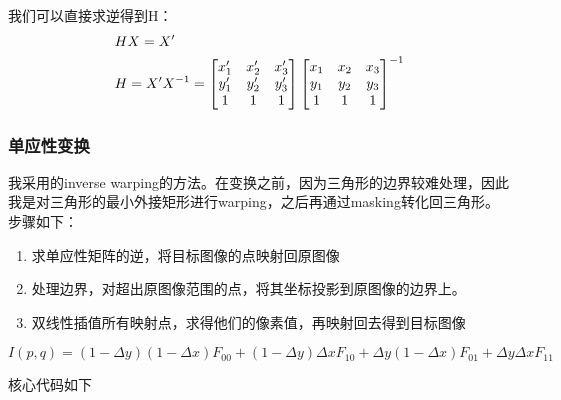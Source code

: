 \documentclass[a4paper]{article}
\begin{document}
我们可以直接求逆得到H：
 \begin{align}
 \centering
 &HX  = X'\\
&H= X'X^{-1} = \begin{bmatrix}x'_1 & x'_2 & x'_3 \\ y'_1 & y'_2 & y'_3 \\1&1&1 \end{bmatrix}  \begin{bmatrix}x_1 & x_2 & x_3 \\ y_1 & y_2 & y_3 \\1&1&1 \end{bmatrix}^{-1}
\end{align}

\subsubsection{单应性变换}
我采用的inverse warping的方法。在变换之前，因为三角形的边界较难处理，因此我是对三角形的最小外接矩形进行warping，之后再通过masking转化回三角形。步骤如下：
\begin{enumerate}
  \item 求单应性矩阵的逆，将目标图像的点映射回原图像
\item 处理边界，对超出原图像范围的点，将其坐标投影到原图像的边界上。
\item 双线性插值所有映射点，求得他们的像素值，再映射回去得到目标图像

  \end{enumerate}
\[
I(p,q) = (1-\Delta y )(1-\Delta x) F_{00}+(1-\Delta y)\Delta x F_{10}+\Delta y(1-\Delta x)F_{01}+\Delta y \Delta x F_{11}\]
\begin{figure}[htpb]
  \centering 
\end{figure}
 核心代码如下
\end{document}
